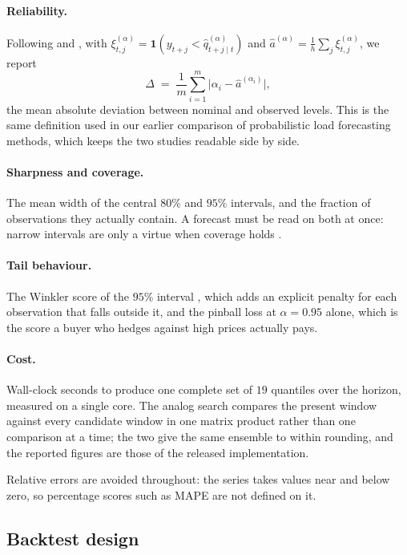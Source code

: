 \documentclass[12pt,a4paper]{article}
\begin{document}
\paragraph{Reliability.} Following \citet{Pinson2007} and \citet{Morales2014}, with
$\xi^{(\alpha)}_{t,j}=\mathbf{1}(y_{t+j}<\hat q^{(\alpha)}_{t+j\mid t})$ and
$\hat a^{(\alpha)}=\frac{1}{h}\sum_j \xi^{(\alpha)}_{t,j}$, we report
\begin{equation}
\Delta \;=\; \frac{1}{m}\sum_{i=1}^{m}
\big|\alpha_i-\hat a^{(\alpha_i)}\big| ,
\label{eq:reliability}
\end{equation}
the mean absolute deviation between nominal and observed levels. This is the
same definition used in our earlier comparison of probabilistic load
forecasting methods, which keeps the two studies readable side by side.

\paragraph{Sharpness and coverage.} The mean width of the central $80\%$ and
$95\%$ intervals, and the fraction of observations they actually contain. A
forecast must be read on both at once: narrow intervals are only a virtue when
coverage holds \citep{GneitingCalibration2007}.

\paragraph{Tail behaviour.} The Winkler score of the $95\%$ interval
\citep{Winkler1972}, which adds an explicit penalty for each observation that
falls outside it, and the pinball loss at $\alpha=0.95$ alone, which is the
score a buyer who hedges against high prices actually pays.

\paragraph{Cost.} Wall-clock seconds to produce one complete set of $19$
quantiles over the horizon, measured on a single core. The analog search
compares the present window against every candidate window in one matrix
product rather than one comparison at a time; the two give the same ensemble to
within rounding, and the reported figures are those of the released
implementation.

Relative errors are avoided throughout: the series takes values near and below
zero, so percentage scores such as MAPE are not defined on it.

\subsection{Backtest design}
\end{document}
